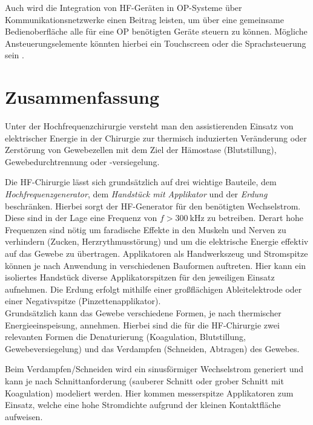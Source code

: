 \documentclass[letterpaper,12pt]{article}
\begin{document}
		Auch wird die Integration von HF-Geräten in OP-Systeme über Kommunikationsnetzwerke einen Beitrag leisten, um über eine gemeinsame Bedienoberfläche alle für eine OP benötigten Geräte steuern zu können. Mögliche Ansteuerungselemente könnten hierbei ein Touchscreen oder die Sprachsteuerung sein \cite{kramme2016medizintechnik}.
		
		

	\newpage
	
	
		
	\newpage	
	\section*{Zusammenfassung}
	
		Unter der Hochfrequenzchirurgie versteht man den assistierenden Einsatz von elektrischer Energie in der Chirurgie zur thermisch induzierten Veränderung oder Zerstörung von Gewebezellen mit dem Ziel der Hämostase (Blutstillung), Gewebedurchtrennung oder -versiegelung.
		
		Die HF-Chirurgie lässt sich grundsätzlich auf drei wichtige Bauteile, dem \emph{Hochfrequenzgenerator}, dem \emph{Handstück mit Applikator} und der \emph{Erdung} beschränken. Hierbei sorgt der HF-Generator für den benötigten Wechselstrom. Diese sind in der Lage eine Frequenz von $f>\SI{300}{\kilo\hertz}$ zu betreiben. Derart hohe Frequenzen sind nötig um faradische Effekte in den Muskeln und Nerven zu verhindern (Zucken, Herzrythmusstörung) und um die elektrische Energie effektiv auf das Gewebe zu übertragen. Applikatoren als Handwerkszeug und Stromspitze können je nach Anwendung in verschiedenen Bauformen auftreten. Hier kann ein isoliertes Handstück diverse Applikatorspitzen für den jeweiligen Einsatz aufnehmen. Die Erdung erfolgt mithilfe einer großflächigen Ableitelektrode oder einer Negativspitze (Pinzettenapplikator).\\
		
		Grundsätzlich kann das Gewebe verschiedene Formen, je nach thermischer Energieeinspeisung, annehmen. Hierbei sind die für die HF-Chirurgie zwei relevanten Formen die Denaturierung (Koagulation, Blutstillung, Gewebeversiegelung) und das Verdampfen (Schneiden, Abtragen) des Gewebes. 
		
		Beim Verdampfen/Schneiden wird ein sinusförmiger Wechselstrom generiert und kann je nach Schnittanforderung (sauberer Schnitt oder grober Schnitt mit Koagulation) modeliert werden. Hier kommen messerspitze Applikatoren zum Einsatz, welche eine hohe Stromdichte aufgrund der kleinen Kontaktfläche aufweisen. 
		
\end{document}
